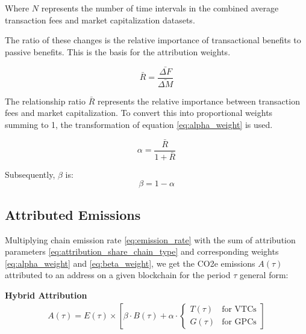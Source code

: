 \documentclass[11pt]{report}
\begin{document}


Where \( N \) represents the number of time intervals in the combined average transaction fees and market capitalization datasets.

The ratio of these changes is the relative importance of transactional benefits to passive benefits. This is the basis for the attribution weights.

\begin{equation} \label{eq:weights_ratio}
    \bar{R} = \frac{\bar{\Delta F}}{\bar{\Delta M}}
\end{equation}

The relationship ratio $\bar{R}$ represents the relative importance between transaction fees and market capitalization. To convert this into proportional weights summing to 1, the transformation of equation \eqref{eq:alpha_weight} is used.

\begin{equation} \label{eq:alpha_weight}
    \alpha = \frac{\bar{R}}{1 + \bar{R}}
\end{equation}

Subsequently, \( \beta \) is:
\begin{equation} \label{eq:beta_weight}
    \beta = 1 - \alpha
\end{equation}


\subsection{Attributed Emissions \label{se:attributed_emissions}}

Multiplying chain emission rate \eqref{eq:emission_rate} with the sum of attribution parameters \eqref{eq:attribution_share_chain_type} and corresponding weights \eqref{eq:alpha_weight} and \eqref{eq:beta_weight}, we get the CO2e emissions \(A(\tau)\) attributed to an address on a given blockchain for the period $\tau$ general form:

\textbf{Hybrid Attribution}
\begin{align}
    A(\tau) = E(\tau) \times \left[\beta \cdot B(\tau) + \alpha \cdot \begin{cases}
                                                                              T(\tau) & \text{for VTCs} \\
                                                                              G(\tau) & \text{for GPCs}
                                                                          \end{cases}\right]
\end{align}
\end{document}
